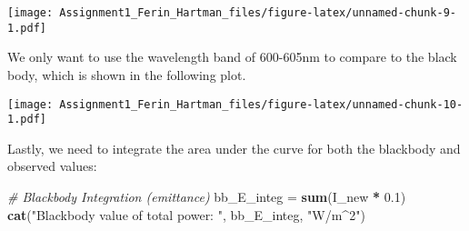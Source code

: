 \documentclass[]{article}
\newenvironment{Shaded}{\begin{snugshade}}{\end{snugshade}}
\newcommand{\KeywordTok}[1]{\textcolor[rgb]{0.13,0.29,0.53}{\textbf{#1}}}
\newcommand{\DataTypeTok}[1]{\textcolor[rgb]{0.13,0.29,0.53}{#1}}
\newcommand{\DecValTok}[1]{\textcolor[rgb]{0.00,0.00,0.81}{#1}}
\newcommand{\FloatTok}[1]{\textcolor[rgb]{0.00,0.00,0.81}{#1}}
\newcommand{\StringTok}[1]{\textcolor[rgb]{0.31,0.60,0.02}{#1}}
\newcommand{\CommentTok}[1]{\textcolor[rgb]{0.56,0.35,0.01}{\textit{#1}}}
\newcommand{\OperatorTok}[1]{\textcolor[rgb]{0.81,0.36,0.00}{\textbf{#1}}}
\newcommand{\NormalTok}[1]{#1}
\begin{document}
\begin{Shaded}
\end{Shaded}

\texttt{[image: Assignment1\_Ferin\_Hartman\_files/figure-latex/unnamed-chunk-9-1.pdf]}

We only want to use the wavelength band of 600-605nm to compare to the
black body, which is shown in the following plot.

\begin{Shaded}
\end{Shaded}

\texttt{[image: Assignment1\_Ferin\_Hartman\_files/figure-latex/unnamed-chunk-10-1.pdf]}

Lastly, we need to integrate the area under the curve for both the
blackbody and observed values:

\begin{Shaded}
\begin{Highlighting}[]
\CommentTok{# Blackbody Integration (emittance)}
\NormalTok{bb_E_integ =}\StringTok{ }\KeywordTok{sum}\NormalTok{(I_new }\OperatorTok{*}\StringTok{ }\FloatTok{0.1}\NormalTok{)}
\KeywordTok{cat}\NormalTok{(}\StringTok{"Blackbody value of total power: "}\NormalTok{, bb_E_integ, }\StringTok{"W/m^2"}\NormalTok{)}
\end{Highlighting}
\end{Shaded}
\end{document}

